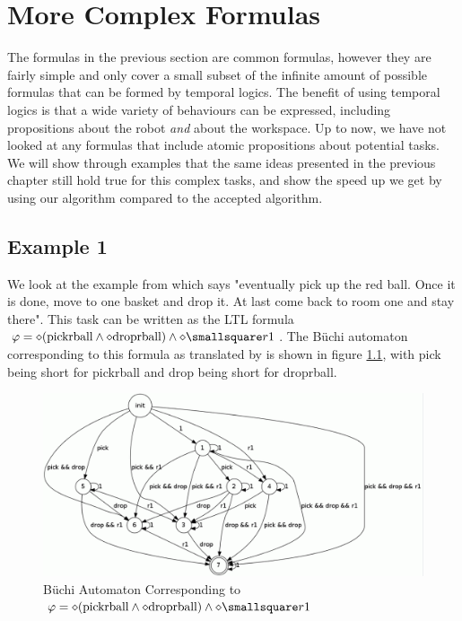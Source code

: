 \chapter{More Complex Formulas}
The formulas in the previous section are common formulas, however they are fairly simple and only cover a small subset of the infinite amount of possible formulas that can be formed by temporal logics. The benefit of using temporal logics is that a wide variety of behaviours can be expressed, including propositions about the robot \textit{and} about the workspace. Up to now, we have not looked at any formulas that include atomic propositions about potential tasks. We will show through examples that the same ideas presented in the previous chapter still hold true for this complex tasks, and show the speed up we get by using our algorithm compared to the accepted algorithm. 

\section{Example 1}
We look at the example from \cite{guo15} which says "eventually pick up the red ball. Once it is done, move to one basket and drop it. At last come back to room one and stay there". This task can be written as the LTL formula $\varphi = \diamond (\text{pickrball} \wedge \diamond \text{droprball}) \wedge \diamond \smallsquare r1$. The B\"uchi automaton corresponding to this formula as translated by \cite{gastin01} is shown in figure \ref{fig:buchiEx1}, with pick being short for pickrball and drop being short for droprball.

\begin{figure}[!htb]
\centering
\includegraphics[scale=0.4]{buchiEx1_1}
\caption{B\"uchi Automaton Corresponding to $\varphi = \diamond (\text{pickrball} \wedge \diamond \text{droprball}) \wedge \diamond \smallsquare r1$}
\label{fig:buchiEx1}
\end{figure} 

